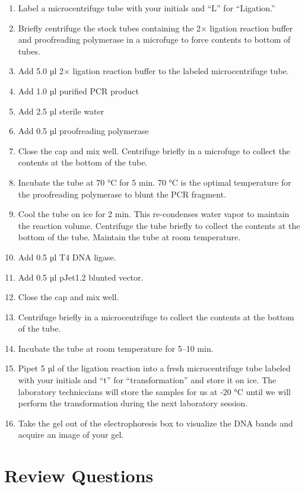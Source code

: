 \documentclass[]{book}
\providecommand{\tightlist}{%
  \setlength{\itemsep}{0pt}\setlength{\parskip}{0pt}}
\begin{document}
\begin{enumerate}
\def\labelenumi{\arabic{enumi}.}
\tightlist
\item
  Label a microcentrifuge tube with your initials and ``L'' for ``Ligation.''
\item
  Briefly centrifuge the stock tubes containing the 2× ligation reaction buffer and proofreading polymerase in a microfuge to force contents to bottom of tubes.
\item
  Add 5.0 µl 2× ligation reaction buffer to the labeled microcentrifuge tube.
\item
  Add 1.0 µl purified PCR product
\item
  Add 2.5 µl sterile water
\item
  Add 0.5 µl proofreading polymerase
\item
  Close the cap and mix well. Centrifuge briefly in a microfuge to collect the contents at the bottom of the tube.
\item
  Incubate the tube at 70 °C for 5 min. 70 °C is the optimal temperature for the proofreading polymerase to blunt the PCR fragment.
\item
  Cool the tube on ice for 2 min. This re-condenses water vapor to maintain the reaction volume.
  Centrifuge the tube briefly to collect the contents at the bottom of the tube. Maintain the tube at room temperature.
\item
  Add 0.5 µl T4 DNA ligase.
\item
  Add 0.5 µl pJet1.2 blunted vector.
\item
  Close the cap and mix well.
\item
  Centrifuge briefly in a microcentrifuge to collect the contents at the bottom of the tube.
\item
  Incubate the tube at room temperature for 5--10 min.
\item
  Pipet 5 µl of the ligation reaction into a fresh microcentrifuge tube labeled with your initials and ``t'' for ``transformation'' and store it on ice. The laboratory techniccians will store the samples for us at -20 °C until we will perform the transformation during the next laboratory session.
\item
  Take the gel out of the electrophoresis box to visualize the DNA bands and acquire an image of your gel.
\end{enumerate}

\hypertarget{review-questions-7}{%
\section{Review Questions}\label{review-questions-7}}
\end{document}
